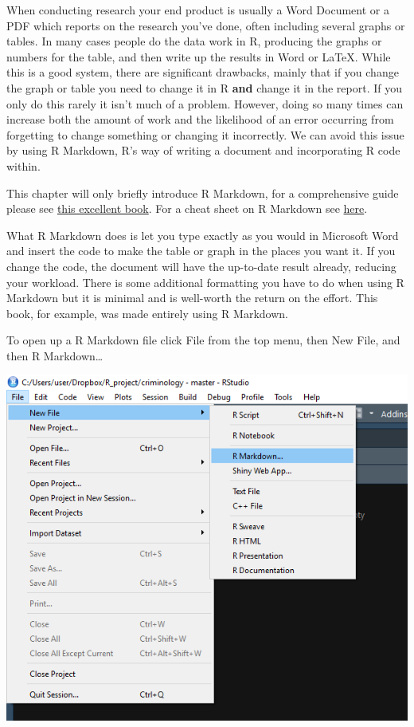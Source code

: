\documentclass[
  12pt,
]{book}
\begin{document}
When conducting research your end product is usually a Word Document or a PDF which reports on the research you've done, often including several graphs or tables. In many cases people do the data work in R, producing the graphs or numbers for the table, and then write up the results in Word or LaTeX. While this is a good system, there are significant drawbacks, mainly that if you change the graph or table you need to change it in R \textbf{and} change it in the report. If you only do this rarely it isn't much of a problem. However, doing so many times can increase both the amount of work and the likelihood of an error occurring from forgetting to change something or changing it incorrectly. We can avoid this issue by using R Markdown, R's way of writing a document and incorporating R code within.

This chapter will only briefly introduce R Markdown, for a comprehensive guide please see \href{https://bookdown.org/yihui/rmarkdown/}{this excellent book}. For a cheat sheet on R Markdown see \href{https://www.rstudio.com/wp-content/uploads/2015/02/rmarkdown-cheatsheet.pdf}{here}.

What R Markdown does is let you type exactly as you would in Microsoft Word and insert the code to make the table or graph in the places you want it. If you change the code, the document will have the up-to-date result already, reducing your workload. There is some additional formatting you have to do when using R Markdown but it is minimal and is well-worth the return on the effort. This book, for example, was made entirely using R Markdown.

To open up a R Markdown file click File from the top menu, then New File, and then R Markdown\ldots{}

\includegraphics{images/markdown1.png}
\end{document}
